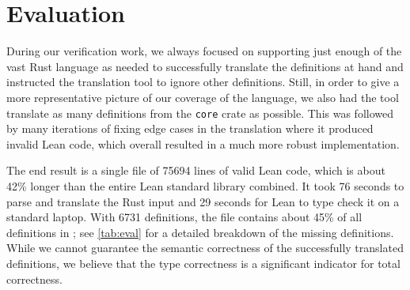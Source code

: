 \section{Evaluation}
\label{sec:eval}

During our verification work, we always focused on supporting just enough of the vast Rust
language as needed to successfully translate the definitions at hand and
instructed the translation tool to ignore other definitions. Still, in order to give a more representative picture of
our coverage of the language, we also had the tool translate as many definitions
from the \verb!core! crate as possible. This was followed by many iterations of
fixing edge cases in the translation where it produced invalid Lean code, which
overall resulted in a much more robust implementation.

The end result is a single file of 75694 lines of valid Lean code, which
is about 42\% longer than the entire Lean standard library combined.
It took 76 seconds to parse and translate the Rust input and 29 seconds for
Lean to type check it on a standard laptop. With 6731
definitions, the file contains about 45\% of all definitions in ; see
\autoref{tab:eval} for a detailed breakdown of the missing definitions. While we
cannot guarantee the semantic correctness of the successfully translated
definitions, we believe that the type correctness is a significant indicator
for total correctness.

